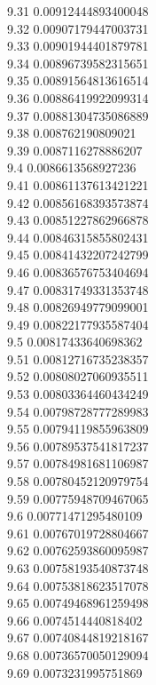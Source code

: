 {9.31	0.00912444893400048\\
9.32	0.00907179447003731\\
9.33	0.00901944401879781\\
9.34	0.00896739582315651\\
9.35	0.00891564813616514\\
9.36	0.00886419922099314\\
9.37	0.00881304735086889\\
9.38	0.008762190809021\\
9.39	0.0087116278886207\\
9.4	0.0086613568927236\\
9.41	0.00861137613421221\\
9.42	0.00856168393573874\\
9.43	0.00851227862966878\\
9.44	0.00846315855802431\\
9.45	0.00841432207242799\\
9.46	0.00836576753404694\\
9.47	0.00831749331353748\\
9.48	0.00826949779099001\\
9.49	0.00822177935587404\\
9.5	0.00817433640698362\\
9.51	0.00812716735238357\\
9.52	0.00808027060935511\\
9.53	0.00803364460434249\\
9.54	0.00798728777289983\\
9.55	0.00794119855963809\\
9.56	0.00789537541817237\\
9.57	0.00784981681106987\\
9.58	0.00780452120979754\\
9.59	0.00775948709467065\\
9.6	0.00771471295480109\\
9.61	0.00767019728804667\\
9.62	0.00762593860095987\\
9.63	0.00758193540873748\\
9.64	0.00753818623517078\\
9.65	0.00749468961259498\\
9.66	0.0074514440818402\\
9.67	0.00740844819218167\\
9.68	0.00736570050129094\\
9.69	0.0073231995751869\\
}
